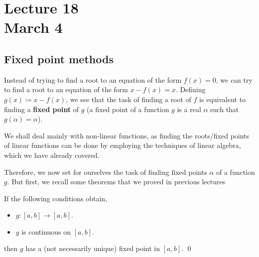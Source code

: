 \chapter*{Lecture 18 \\ March 4}
\setcounter{chapter}{18}
\setcounter{section}{0}

\section{Fixed point methods}

Instead of trying to find a root to an equation of the form $f(x) = 0$, we can try to find a root to an equation of the form $x - f(x) = x$. Defining $g(x) \coloneqq x - f(x)$, we see that the task of finding a root of $f$ is equivalent to finding a \textbf{fixed point} of $g$ (a fixed point of a function $g$ is a real $\alpha$ such that $g(\alpha) = \alpha$).

We shall deal mainly with non-linear functions, as finding the roots/fixed points of linear functions can be done by employing the techniques of linear algebra, which we have already covered.

Therefore, we now set for ourselves the task of finding fixed points $\alpha$ of a function $g$. But first, we recall some theorems that we proved in previous lectures

\begin{thm}
  \label{mar4:thm:efp}
  \hfill
  
  If the following conditions obtain,
  \begin{itemize}
  \item
    $g \colon [a, b] \to [a, b]$.
    
  \item
    $g$ is continuous on $[a, b]$.
    
  \end{itemize}
  then $g$ has a (not necessarily unique) fixed point in $[a, b]$.
  \hfill\qed
\end{thm}

